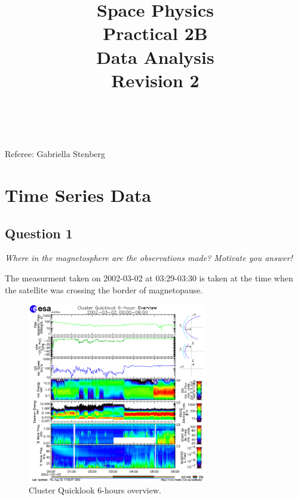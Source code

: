 \documentclass{article}
\title{\textbf {Space Physics} \\ Practical 2B\\ Data Analysis\\ Revision 2} %
\author{\authorivan\\\authoranu}
\begin{document}
\maketitle %

\centerline{Referee: Gabriella Stenberg}

\setlength\parindent{0pt} %

\renewcommand{\labelenumi}{\alph{enumi}} %
\clearpage

\tableofcontents

\listoffigures

\clearpage

\section{Time Series Data}

\subsection{Question 1}
\textit{Where in the magnetosphere are the observations made? Motivate you
answer!}

The measurment taken on 2002-03-02 at 03:29-03:30 is taken at the time when the satellite was crossing the border of magnetopause.

\begin{figure}[htb!]
\centering
\includegraphics[width=0.7\textwidth]{Figures/cluster.png}
\caption{Cluster Quicklook 6-hours overview.}
\label{fig:cluster}
\end{figure}
\end{document}
